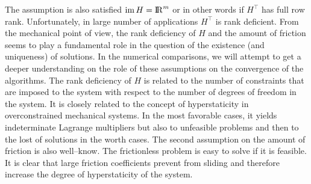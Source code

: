 {The assumption is also satisfied  $\mathrm{im}\, H = \mathrm{I\!R}^m$ or in other words if $H^\top$ has full row rank. Unfortunately, in large number of applications $H^\top$ is rank deficient. 
From the mechanical point of view, the rank deficiency of $H$ and the amount of friction seems to play a fundamental role in the question of the existence (and uniqueness) of solutions. In the numerical comparisons, we will attempt to get a deeper understanding on the role of these assumptions on the convergence of the algorithms. The rank deficiency  of $H$ is related to the number of constraints that are imposed to the system with respect to the number of degrees of freedom in the system. It is closely related to the concept of hyperstaticity in overconstrained mechanical  systems. In the most favorable cases, it yields  indeterminate Lagrange multipliers but also to unfeasible problems and then to the lost of solutions in the worth cases. The second assumption on the amount of friction is also well--know. The frictionless problem is  easy to solve if it is  feasible. It is clear that large friction coefficients prevent from sliding and therefore increase the degree of hyperstaticity of the system. 












}
